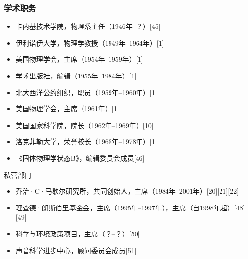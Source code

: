 \subsubsection{学术职务}
\begin{itemize}
\item 卡内基技术学院，物理系主任（1946年–？）[45]  
\item 伊利诺伊大学，物理学教授（1949年–1964年）[1]  
\item 美国物理学会，主席（1954年–1959年）[1]  
\item 学术出版社，编辑（1955年–1984年）[1]  
\item 北大西洋公约组织，职员（1959年–1960年）[1]  
\item 美国物理学会，主席（1961年）[1]  
\item 美国国家科学院，院长（1962年–1969年）[10]  
\item 洛克菲勒大学，荣誉校长（1968年–1978年）[1]  
\item 《固体物理学状态B》，编辑委员会成员[46]
\end{itemize}
私营部门
\begin{itemize}
\item 乔治·C·马歇尔研究所，共同创始人，主席（1984年–2001年）[20][21][22]  
\item 理查德·朗斯伯里基金会，主席（1995年–1997年），主席（自1998年起）[48][49]  
\item 科学与环境政策项目，主席（？–？）[50]  
\item 声音科学进步中心，顾问委员会成员[51]
\end{itemize}